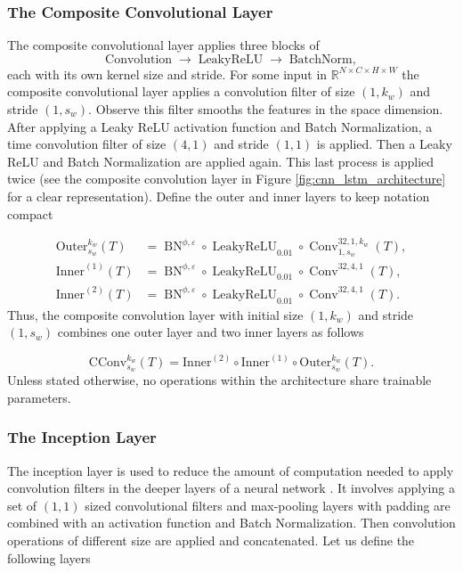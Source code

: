 \documentclass[10pt,a4paper,oneside]{article}
\newcommand{\R}{\mathbb{R}}
\DeclareMathOperator{\LeakyReLU}{LeakyReLU}
\DeclareMathOperator{\batchnorm}{BN}
\DeclareMathOperator{\convolution}{Conv}
\begin{document}
\subsubsection{The Composite Convolutional Layer}
\label{subsubsec:comp_conv}

The composite convolutional layer applies three blocks of
\[
  \text{Convolution} \;\to\;\text{LeakyReLU} \;\to\;\text{BatchNorm},
\]
each with its own kernel size and stride. For some input in $\R^{N \times C \times H \times W}$ the composite convolutional layer applies a convolution filter of size $(1, k_w)$ and stride $(1, s_w)$. Observe this filter smooths the features in the space dimension. After applying a Leaky ReLU activation function and Batch Normalization, a time convolution filter of size $(4, 1)$ and stride $(1, 1)$ is applied. Then a Leaky ReLU and Batch Normalization are applied again. This last process is applied twice (see the composite convolution layer in Figure \ref{fig:cnn_lstm_architecture} for a clear representation). Define the outer and inner layers to keep notation compact

\begin{align*}
    \mathrm{Outer}^{k_w}_{s_w}(T) &= \batchnorm^{\phi, \varepsilon} \circ \LeakyReLU_{0.01} \circ \convolution^{32, 1, k_w}_{1, s_w}(T),\\
    \mathrm{Inner}^{(1)}(T) &= \batchnorm^{\phi,\varepsilon}\circ\LeakyReLU_{0.01}\circ\convolution^{32,4,1}(T),\\
\mathrm{Inner}^{(2)}(T) &= \batchnorm^{\phi,\varepsilon}\circ\LeakyReLU_{0.01}\circ\convolution^{32,4,1}(T).
\end{align*}
Thus, the composite convolution layer with initial size $(1, k_w)$ and stride $(1, s_w)$ combines one outer layer and two inner layers as follows 

$$
\mathrm{CConv}^{k_w}_{s_w}(T) = \mathrm{Inner}^{(2)} \circ \mathrm{Inner}^{(1)} \circ \mathrm{Outer}^{k_w}_{s_w} (T).
$$
Unless stated otherwise, no operations within the architecture share trainable parameters.

\subsubsection{The Inception Layer}

The inception layer is used to reduce the amount of computation needed to apply convolution filters in the deeper layers of a neural network \cite{szegedy2015going}. It involves applying a set of $(1, 1)$ sized convolutional filters and max-pooling layers with padding are combined with an activation function and Batch Normalization. Then convolution operations of different size are applied and concatenated. Let us define the following layers
\end{document}
